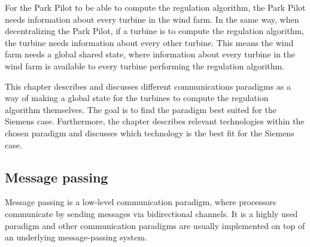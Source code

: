 
For the Park Pilot to be able to compute the regulation algorithm, the Park Pilot needs information about every turbine in the wind farm. In the same way, when decentralizing the Park Pilot, if a turbine is to compute the regulation algorithm, the turbine needs information about every other turbine. This means the wind farm needs a global shared state, where information about every turbine in the wind farm is available to every turbine performing the regulation algorithm. 


This chapter describes and discusses different communications paradigms as a way of making a global state for the turbines to compute the regulation algorithm themselves. The goal is to find the paradigm best suited for the Siemens case. Furthermore, the chapter describes relevant technologies within the chosen paradigm and discusses which technology is the best fit for the Siemens case.


%



\subsection{Message passing}

Message passing is a low-level communication paradigm, where processors communicate by sending messages via bidirectional channels. It is a highly used paradigm and other communication paradigms are usually implemented on top of an underlying message-passing system.  

